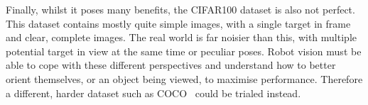 \documentclass[11pt]{article}
\def\DATASET{CIFAR100 }
\begin{document}
Finally, whilst it poses many benefits, the \DATASET dataset is also not perfect. This dataset contains mostly quite simple images, with a single target in frame and clear, complete images. The real world is far noisier than this, with multiple potential target in view at the same time or peculiar poses. Robot vision must be able to cope with these different perspectives and understand how to better orient themselves, or an object being viewed, to maximise performance. Therefore a different, harder dataset such as COCO~\cite{COCO} could be trialed instead.

\renewcommand*{\bibfont}{\tiny}
\printbibliography
\end{document}
